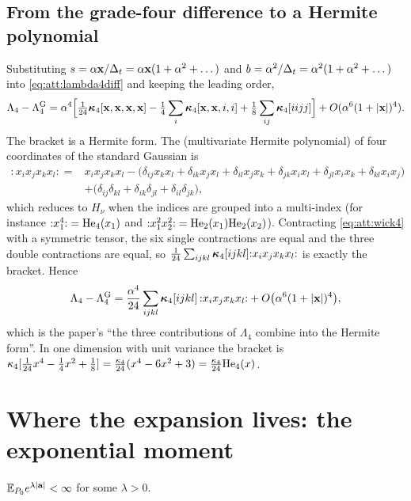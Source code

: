 \subsection{From the grade-four difference to a Hermite polynomial}

Substituting $s=\alpha\mathbf{x}/\Delta_t=\alpha\mathbf{x}(1+\alpha^2+\dots)$ and $b=\alpha^2/\Delta_t=\alpha^2(1+\alpha^2+\dots)$
into \cref{eq:att:lambda4diff} and keeping the leading order,
\[
  \Lambda_4-\Lambda_4^{\mathrm G}=\alpha^4\Bigl[\tfrac1{24}\bm{\kappa}_4[\mathbf{x},\mathbf{x},\mathbf{x},\mathbf{x}]-\tfrac14\sum_i\bm{\kappa}_4[\mathbf{x},\mathbf{x},i,i]+\tfrac18\sum_{ij}\bm{\kappa}_4[iijj]\Bigr]+O(\alpha^6(1+|\mathbf{x}|)^4).
\]
The bracket is a Hermite form. The  (multivariate Hermite
polynomial) of four coordinates of the standard Gaussian is
\begin{equation}
\begin{aligned}
  {:}x_ix_jx_kx_l{:}={}&x_ix_jx_kx_l-\bigl(\delta_{ij}x_kx_l+\delta_{ik}x_jx_l+\delta_{il}x_jx_k+\delta_{jk}x_ix_l+\delta_{jl}x_ix_k+\delta_{kl}x_ix_j\bigr)\\
   &+\bigl(\delta_{ij}\delta_{kl}+\delta_{ik}\delta_{jl}+\delta_{il}\delta_{jk}\bigr),
\end{aligned}
  \label{eq:att:wick4}
\end{equation}
which reduces to $H_\nu$ when the indices are grouped into a multi-index (for instance
${:}x_1^4{:}=\mathrm{He}_{4}(x_1)$ and ${:}x_1^2x_2^2{:}=\mathrm{He}_{2}(x_1)\mathrm{He}_{2}(x_2)$). Contracting
\cref{eq:att:wick4} with a symmetric tensor, the six single contractions are equal and
the three double contractions are equal, so
$\tfrac1{24}\sum_{ijkl}\bm{\kappa}_4[ijkl]{:}x_ix_jx_kx_l{:}$ is exactly the bracket. Hence
\begin{equation}
  \Lambda_4-\Lambda_4^{\mathrm G}=\frac{\alpha^4}{24}\sum_{ijkl}\bm{\kappa}_4[ijkl]\,{:}x_ix_jx_kx_l{:}+O\bigl(\alpha^6(1+|\mathbf{x}|)^4\bigr),
  \label{eq:att:hermiteform}
\end{equation}
which is the paper's ``the three contributions of $\Lambda_4$ combine into the Hermite
form''. In one dimension with unit variance the bracket is
$\kappa_4[\tfrac1{24}x^4-\tfrac14x^2+\tfrac18]=\tfrac{\kappa_4}{24}(x^4-6x^2+3)=\tfrac{\kappa_4}{24}\mathrm{He}_{4}(x)$.

\section{Where the expansion lives: the exponential moment}
\label{sec:att:analytic}

\begin{assumption}
\label{ass:att:E}
$\mathbb{E}_{P_0}e^{\lambda|\mathbf{a}|}<\infty$ for some $\lambda>0$.
\end{assumption}

